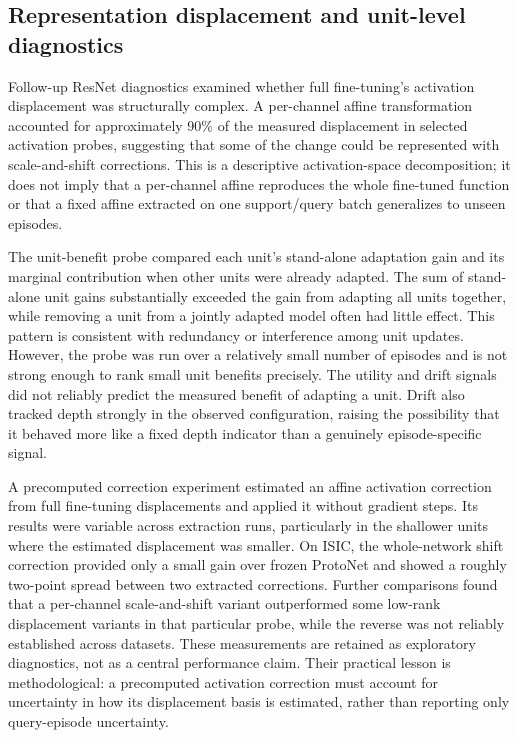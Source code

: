 \documentclass[11pt]{article}
\begin{document}
\subsection{Representation displacement and unit-level diagnostics}

Follow-up ResNet diagnostics examined whether full fine-tuning's activation displacement was structurally complex. A per-channel affine transformation accounted for approximately 90\% of the measured displacement in selected activation probes, suggesting that some of the change could be represented with scale-and-shift corrections. This is a descriptive activation-space decomposition; it does not imply that a per-channel affine reproduces the whole fine-tuned function or that a fixed affine extracted on one support/query batch generalizes to unseen episodes.

The unit-benefit probe compared each unit's stand-alone adaptation gain and its marginal contribution when other units were already adapted. The sum of stand-alone unit gains substantially exceeded the gain from adapting all units together, while removing a unit from a jointly adapted model often had little effect. This pattern is consistent with redundancy or interference among unit updates. However, the probe was run over a relatively small number of episodes and is not strong enough to rank small unit benefits precisely. The utility and drift signals did not reliably predict the measured benefit of adapting a unit. Drift also tracked depth strongly in the observed configuration, raising the possibility that it behaved more like a fixed depth indicator than a genuinely episode-specific signal.

A precomputed correction experiment estimated an affine activation correction from full fine-tuning displacements and applied it without gradient steps. Its results were variable across extraction runs, particularly in the shallower units where the estimated displacement was smaller. On ISIC, the whole-network shift correction provided only a small gain over frozen ProtoNet and showed a roughly two-point spread between two extracted corrections. Further comparisons found that a per-channel scale-and-shift variant outperformed some low-rank displacement variants in that particular probe, while the reverse was not reliably established across datasets. These measurements are retained as exploratory diagnostics, not as a central performance claim. Their practical lesson is methodological: a precomputed activation correction must account for uncertainty in how its displacement basis is estimated, rather than reporting only query-episode uncertainty.
\end{document}
